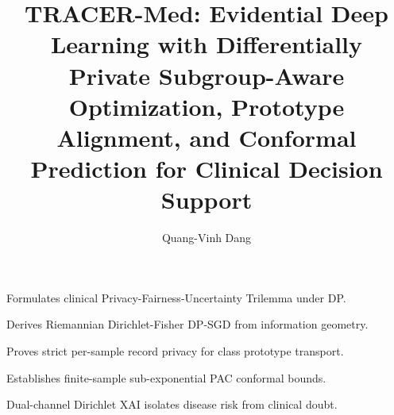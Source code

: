 \documentclass[3p,12pt]{elsarticle}
\theoremstyle{plain}
\theoremstyle{definition}
\begin{document}
\begin{frontmatter}

\title{TRACER-Med: Evidential Deep Learning with Differentially Private Subgroup-Aware Optimization, Prototype Alignment, and Conformal Prediction for Clinical Decision Support}

\author[inst1]{Quang-Vinh Dang}


\begin{highlights}
\item Formulates clinical Privacy-Fairness-Uncertainty Trilemma under DP.
\item Derives Riemannian Dirichlet-Fisher DP-SGD from information geometry.
\item Proves strict per-sample record privacy for class prototype transport.
\item Establishes finite-sample sub-exponential PAC conformal bounds.
\item Dual-channel Dirichlet XAI isolates disease risk from clinical doubt.
\end{highlights}


\end{frontmatter}
\end{document}
